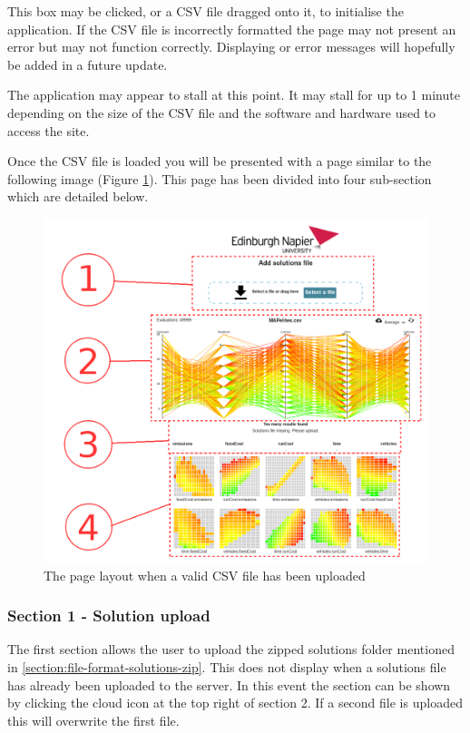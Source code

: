 This box may be clicked, or a CSV file dragged onto it, to initialise the application.  If the CSV file is incorrectly formatted the page may not present an error but may not function correctly.  Displaying or error messages will hopefully be added in a future update.

The application may appear to stall at this point.  It may stall for up to 1 minute depending on the size of the CSV file and the software and hardware used to access the site.

Once the CSV file is loaded you will be presented with a page similar to the following image (Figure \ref{img:csv-uploaded-page-layout}).  This page has been divided into four sub-section which are detailed below.

\begin{figure}[h]
	\includegraphics[width=\linewidth]{images/csv-uploaded-page-layout.png}
	\caption{The page layout when a valid CSV file has been uploaded}
	\label{img:csv-uploaded-page-layout}
\end{figure}

\subsubsection{Section 1 - Solution upload} \label{section:solutions-upload}

The first section allows the user to upload the zipped solutions folder mentioned in \ref{section:file-format-solutions-zip}.  This does not display when a solutions file has already been uploaded to the server.  In this event the section can be shown by clicking the cloud icon at the top right of section 2.  If a second file is uploaded this will overwrite the first file.

